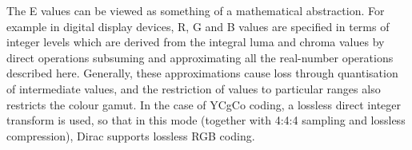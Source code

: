 The E values can be viewed as something of a mathematical abstraction.
For example in digital display devices, R, G and B values are specified
in terms of integer levels which are derived from the integral luma and
chroma values by direct operations subsuming and approximating all the
real-number operations described here. Generally, these approximations
cause loss through quantisation of intermediate values, and the
restriction of values to particular ranges also restricts the colour
gamut. In the case of YCgCo coding, a lossless direct integer transform
is used, so that in this mode (together with 4:4:4 sampling and lossless
compression), Dirac supports lossless RGB coding.



